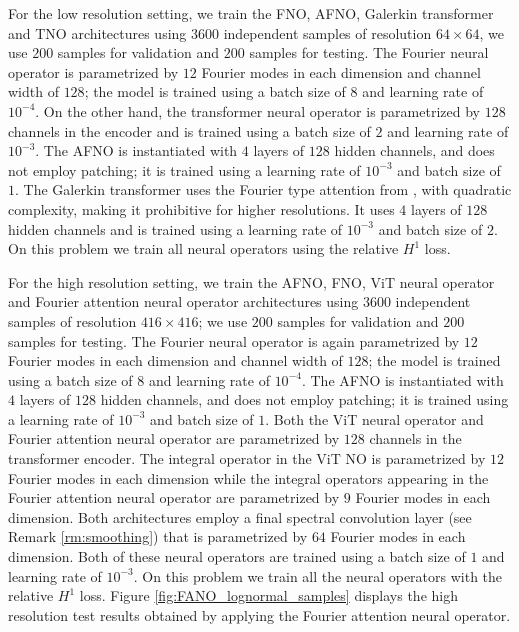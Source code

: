 \documentclass[twoside]{article}
\newcommand{\1}{\mathbbm{1}}
\begin{document}
For the low resolution setting, we train the FNO, AFNO, Galerkin transformer and TNO architectures using $3600$ independent samples of resolution $64\times 64$, we use $200$ samples for validation and $200$ samples for testing. The Fourier neural operator is parametrized by $12$ Fourier modes in each dimension and channel width of $128$; the model is trained using a batch size of $8$ and learning rate of $10^{-4}$. On the other hand, the transformer neural operator is parametrized by $128$ channels in the encoder and is trained using a batch size of $2$ and learning rate of $10^{-3}$. The AFNO is instantiated with $4$ layers of $128$ hidden channels, and does not employ patching; it is trained using a learning rate of $10^{-3}$ and batch size of $1$. The Galerkin transformer uses the Fourier type attention from \cite{cao2021choose}, with quadratic complexity, making it prohibitive for higher resolutions. It uses $4$ layers of $128$ hidden channels and is trained using a learning rate of $10^{-3}$ and batch size of $2$. On this problem we train all neural operators using the relative $H^1$  loss. 


For the high resolution setting, we train the AFNO, FNO, ViT neural operator and Fourier attention neural operator architectures using $3600$ independent samples of resolution $416\times 416$; we use $200$ samples for validation and $200$ samples for testing. The Fourier neural operator is again parametrized by $12$ Fourier modes in each dimension and channel width of $128$; the model is trained using a batch size of $8$ and learning rate of $10^{-4}$. The AFNO is instantiated with $4$ layers of $128$ hidden channels, and does not employ patching; it is trained using a learning rate of $10^{-3}$ and batch size of $1$. Both the ViT neural operator and Fourier attention neural operator are parametrized by $128$ channels in the transformer encoder. The integral operator in the ViT NO is parametrized by $12$ Fourier modes in each dimension while the integral operators appearing in the Fourier attention neural operator are parametrized by $9$ Fourier modes in each dimension. Both architectures employ a final spectral convolution layer (see Remark \ref{rm:smoothing}) that is parametrized by $64$ Fourier modes in each dimension. Both of these neural operators are trained using a batch size of $1$ and learning rate of $10^{-3}$. On this problem we train all the neural operators with the relative $H^1$  loss. Figure \ref{fig:FANO_lognormal_samples} displays the high resolution test results obtained by applying the Fourier attention neural operator. 
\end{document}

